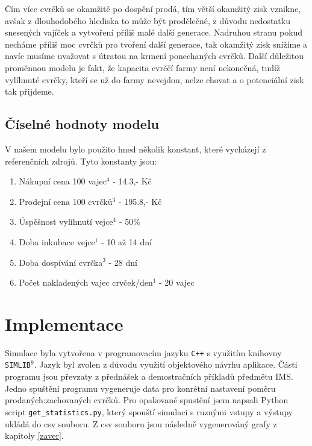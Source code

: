 \documentclass[a4paper, 12pt]{extarticle}
\begin{document}
Čím více cvrčků se okamžitě po dospění prodá, tím větší okamžitý zisk vznikne, avšak z dlouhodobého hlediska to může být prodělečné, z důvodu nedostatku snesených vajíček a vytvoření příliš malé další generace. Nadruhou stranu pokud necháme příliš moc cvrčků pro tvoření další generace, tak okamžitý zisk snížíme a navíc musíme uvažovat s útratou na krmení ponechaných cvrčků. Další důležitou proměnnou modelu je fakt, že kapacita cvrččí farmy není nekonečná, tudíž vylíhnuté cvrčky, kteří se už do farmy nevejdou, nelze chovat a o potenciální zisk tak přijdeme.

\subsection{Číselné hodnoty modelu}
V našem modelu bylo použito hned několik konstant, které vycházejí z referenčních zdrojů. Tyto konstanty jsou: 
\begin{enumerate}
\item Nákupní cena 100 vajec$^{4}$	-	14.3,- Kč
\item Prodejní cena 100 cvrčků$^{3}$	-	195.8,- Kč
\item Úspěšnost vylíhnutí vejce$^{4}$	-	50\%
\item Doba inkubace vejce$^{1}$ 	-	10 až 14 dní
\item Doba dospívání cvrčka$^{3}$ -  	28 dní
\item Počet nakladených vajec crvček/den$^{1}$ - 20 vajec
\end{enumerate}

\section{Implementace}
Simulace byla vytvořena v programovacím jazyku \texttt{C++} s využitím knihovny \texttt{SIMLIB}$^{9}$. Jazyk byl zvolen z důvodu využití objektového návrhu aplikace. Části programu jsou převzaty z přednášek a demostračních příkladů předmětu IMS. Jedno spuštění programu vygeneruje data pro konrétní nastavení poměru prodaných:zachovaných cvrčků. Pro opakované spustění jsem napsali Python script \texttt{get\_statistics.py}, který spouští simulaci s ruznými vstupy a výstupy ukládá do csv souboru. Z csv souboru jsou následně vygenerováný grafy z kapitoly \ref{zaver}.
\end{document}
